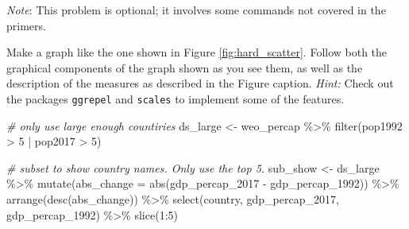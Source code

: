 \documentclass[11pt]{article}
\newcommand{\code}[1]{\colorbox{light-gray}{\texttt{#1}}}
\newenvironment{Shaded}{\begin{snugshade}}{\end{snugshade}}
\newcommand{\AttributeTok}[1]{\textcolor[rgb]{0.77,0.63,0.00}{#1}}
\newcommand{\CommentTok}[1]{\textcolor[rgb]{0.56,0.35,0.01}{\textit{#1}}}
\newcommand{\DecValTok}[1]{\textcolor[rgb]{0.00,0.00,0.81}{#1}}
\newcommand{\FunctionTok}[1]{\textcolor[rgb]{0.00,0.00,0.00}{#1}}
\newcommand{\NormalTok}[1]{#1}
\newcommand{\OtherTok}[1]{\textcolor[rgb]{0.56,0.35,0.01}{#1}}
\newcommand{\SpecialCharTok}[1]{\textcolor[rgb]{0.00,0.00,0.00}{#1}}
\begin{document}
\emph{Note}: This problem is optional; it involves some commands not
covered in the primers.

\medskip

Make a graph like the one shown in Figure \ref{fig:hard_scatter}. Follow
both the graphical components of the graph shown as you see them, as
well as the description of the measures as described in the Figure
caption. \emph{Hint:} Check out the packages \code{ggrepel} and
\code{scales} to implement some of the features.

\begin{Shaded}
\begin{Highlighting}[]
\CommentTok{\# only use large enough countiries}
\NormalTok{ds\_large }\OtherTok{\textless{}{-}}\NormalTok{ weo\_percap }\SpecialCharTok{\%\textgreater{}\%}
  \FunctionTok{filter}\NormalTok{(pop1992 }\SpecialCharTok{\textgreater{}} \DecValTok{5} \SpecialCharTok{|}\NormalTok{ pop2017 }\SpecialCharTok{\textgreater{}} \DecValTok{5}\NormalTok{)}

\CommentTok{\# subset to show country names. Only use the top 5.}
\NormalTok{sub\_show }\OtherTok{\textless{}{-}}\NormalTok{ ds\_large }\SpecialCharTok{\%\textgreater{}\%}
  \FunctionTok{mutate}\NormalTok{(}\AttributeTok{abs\_change =} \FunctionTok{abs}\NormalTok{(gdp\_percap\_2017 }\SpecialCharTok{{-}}\NormalTok{ gdp\_percap\_1992)) }\SpecialCharTok{\%\textgreater{}\%}
  \FunctionTok{arrange}\NormalTok{(}\FunctionTok{desc}\NormalTok{(abs\_change)) }\SpecialCharTok{\%\textgreater{}\%}
  \FunctionTok{select}\NormalTok{(country, gdp\_percap\_2017, gdp\_percap\_1992) }\SpecialCharTok{\%\textgreater{}\%}
  \FunctionTok{slice}\NormalTok{(}\DecValTok{1}\SpecialCharTok{:}\DecValTok{5}\NormalTok{)}


\end{Highlighting}
\end{Shaded}
\end{document}
